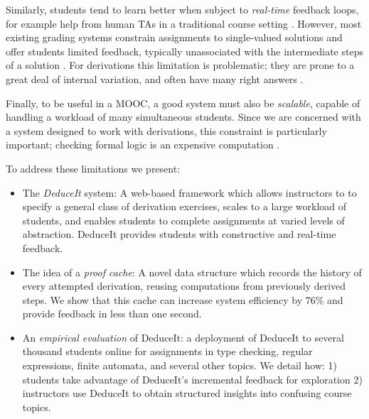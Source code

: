 \documentclass{sigchi}
\begin{document}
Similarly, students tend to learn better when subject to \textit{real-time} feedback loops, for example help from human TAs in a traditional course setting \cite{personalized-feedback, derivation-scoring}. However, most existing grading systems constrain assignments to single-valued solutions and offer students limited feedback, typically unassociated with the intermediate steps of a solution \cite{coursera-doc}. For derivations this limitation is problematic; they are prone to a great deal of internal variation, and often have many right answers \cite{derivation-scoring}. 


Finally, to be useful in a MOOC, a good system must also be \textit{scalable}, capable of handling a workload of many simultaneous students. Since we are concerned with a system designed to work with derivations, this constraint is particularly important; checking formal logic is an expensive computation \cite{bisearch}.

To address these limitations we present:
\begin{itemize}
\item The \textit{DeduceIt} system: A web-based framework which allows instructors to to specify a general class of derivation exercises, scales to a large workload of students, and enables students to complete assignments at varied levels of abstraction. DeduceIt provides students with constructive and real-time feedback.
\item The idea of a \textit{proof cache}: A novel data structure which records the history of every attempted derivation, reusing computations from previously derived steps. We show that this cache can increase system efficiency by 76\% and provide feedback in less than one second.
\item An \textit{empirical evaluation} of DeduceIt: a deployment of DeduceIt to several thousand students online for assignments in type checking, regular expressions, finite automata, and several other topics. We detail how: 1) students take advantage of DeduceIt's incremental feedback for exploration 2) instructors use DeduceIt to obtain structured insights into confusing course topics.
\end{itemize}
\end{document}
